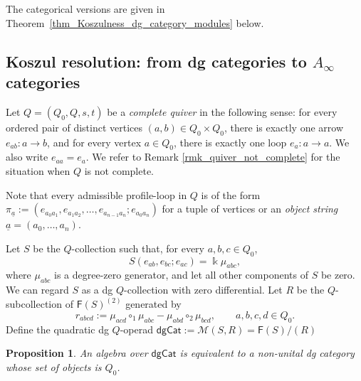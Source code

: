 \documentclass[11pt,letterpaper]{article}
\numberwithin{equation}{section}
\theoremstyle{plain}
\newtheorem{prop}[thm]{Proposition}
\theoremstyle{definition}
\theoremstyle{remark}
\begin{document}
The categorical versions are given in
Theorem~\ref{thm_Koszulness_dg_category_modules} below.

	\subsection{Koszul resolution: from dg categories to \texorpdfstring{$A_\infty$}{A-infinity} categories}
	\label{ss_example_dg_categories}

	Let $Q=(Q_0,Q,s,t)$ be a \textit{complete quiver} in the following sense: for every ordered pair of distinct vertices $(a,b)\in Q_0\times Q_0$, there is exactly
	one arrow $e_{ab}:a\to b$, and for every vertex $a\in Q_0$, there is exactly
	one loop $e_a:a\to a$. We also write $e_{aa}=e_a$.
	We refer to Remark \ref{rmk_quiver_not_complete} for the situation when $Q$ is not complete.

	Note that every admissible profile-loop in
	$Q$ is of the form
	$\pi_{\underline a}	:= (e_{a_0a_1},e_{a_1a_2},\ldots,e_{a_{n-1}a_n};e_{a_0a_n})$ for a tuple of vertices or an \textit{object string} $\underline a=(a_0,\ldots,a_n)$.

	Let $S$ be the $Q$-collection such that, for every $a,b,c\in Q_0$,
	\begin{equation}
		\label{eq_mu_abc}
		S(e_{ab},e_{bc};e_{ac})=\Bbbk\mu_{abc},
	\end{equation}
	where $\mu_{abc}$ is a degree-zero generator, and let all other components
	of $S$ be zero. We can regard $S$ as a dg $Q$-collection with zero differential.
	Let $R$ be the $Q$-subcollection of $\mathsf F(S)^{(2)}$ generated by
	\begin{equation}
		\label{eq_relations_dgCat}
		r_{abcd}
		:=
		\mu_{acd}\circ_1\mu_{abc}
		-
		\mu_{abd}\circ_2\mu_{bcd},
		\qquad a,b,c,d\in Q_0.
	\end{equation}
	Define the quadratic dg $Q$-operad
	$\mathsf{dgCat}
	:=
	\mathscr M(S,R)
	=
	\mathsf F(S)/(R)$

	\begin{prop}
		\label{prop_dgCat_algebras}
		An algebra over $\mathsf{dgCat}$ is equivalent to a non-unital dg
		category whose set of objects is $Q_0$.
	\end{prop}
\end{document}
